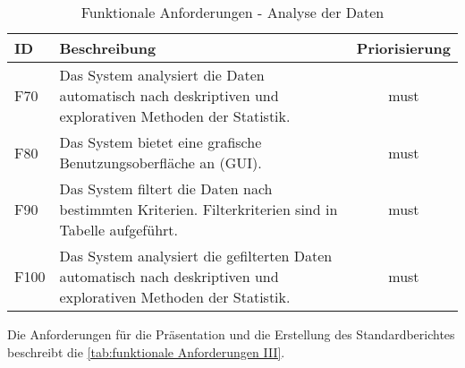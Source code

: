 \begingroup
\setlength{\tabcolsep}{10pt} %
\renewcommand{\arraystretch}{1.25} 
\begin{table}[h]
    \centering
    \begin{adjustbox}{max width=\textwidth}
    \begin{tabular}{lp{13cm}c}
       \toprule
       \textbf{ID}          & \textbf{Beschreibung} &\textbf{Priorisierung}\\
       \midrule
        F70                               &Das System analysiert die Daten automatisch nach deskriptiven und explorativen Methoden der Statistik.  & must\\
        F80                               &Das System bietet eine grafische Benutzungsoberfläche an (GUI).  & must\\
        F90                               &Das System filtert die Daten nach bestimmten Kriterien. Filterkriterien sind in Tabelle aufgeführt. & must\\
        F100                              &Das System analysiert die gefilterten Daten automatisch nach deskriptiven und explorativen Methoden der Statistik. & must\\
        \bottomrule
    \end{tabular}
    \end{adjustbox}
    \caption{%
        Funktionale Anforderungen - Analyse der Daten
    }
    \label{tab:funktionale Anforderungen II}
    \end{table}
\endgroup

Die Anforderungen für die Präsentation und die Erstellung des Standardberichtes beschreibt die \autoref{tab:funktionale Anforderungen III}.


